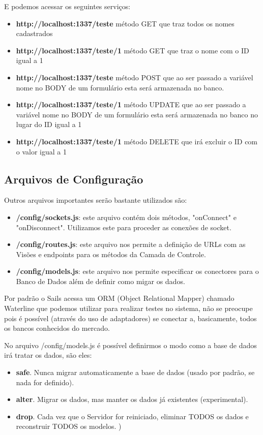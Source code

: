\documentclass[a4paper,11pt]{article}
\begin{document}
E podemos acessar os seguintes serviços: \vspace{-1em}
\begin{itemize}
  \item \textbf{http://localhost:1337/teste} método GET que traz todos os nomes cadastrados
  \item \textbf{http://localhost:1337/teste/1} método GET que traz o nome com o ID igual a 1
  \item \textbf{http://localhost:1337/teste} método POST que ao ser passado a variável nome no BODY de um formulário esta será armazenada no banco.
  \item \textbf{http://localhost:1337/teste/1} método UPDATE que ao ser passado a variável nome no BODY de um formulário esta será armazenada no banco no lugar do ID igual a 1 
  \item \textbf{http://localhost:1337/teste/1} método DELETE que irá excluir o ID com o valor igual a 1
\end{itemize}

\subsection{Arquivos de Configuração}
Outros arquivos importantes serão bastante utilizados são: \vspace{-1em}
\begin{itemize}
  \item \textbf{/config/sockets.js}: este arquivo contém dois métodos, "onConnect" e "onDisconnect". Utilizamos este para proceder as conexões de socket.
  \item \textbf{/config/routes.js}: este arquivo nos permite a definição de URLs com as Visões e endpoints para os métodos da Camada de Controle.
  \item \textbf{/config/models.js}: este arquivo nos permite especificar os conectores para o Banco de Dados além de definir como migar os dados.
\end{itemize}

Por padrão o Sails acessa um ORM (Object Relational Mapper) chamado Waterline que podemos utilizar para realizar testes no sistema, não se preocupe pois é possível (através do uso de adaptadores) se conectar a, basicamente, todos os bancos conhecidos do mercado.

No arquivo /config/models.js é possível definirmos o modo como a base de dados irá tratar os dados, são eles: \vspace{-1em}
\begin{itemize}
  \item \textbf{safe}. Nunca migrar automaticamente a base de dados (usado por padrão, se nada for definido).
  \item \textbf{alter}. Migrar os dados, mas manter os dados já existentes (experimental).
  \item \textbf{drop}. Cada vez que o Servidor for reiniciado, eliminar TODOS os dados e reconstruir TODOS os modelos.
)
\end{itemize}
\end{document}

